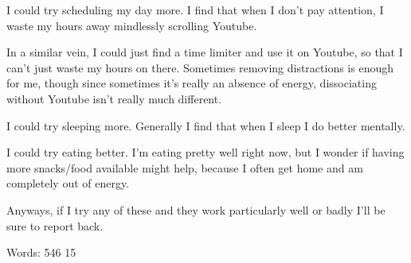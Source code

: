 \documentclass[12pt]{article}[titlepage]
\newcommand{\1}{\={a}}
\newcommand{\2}{\={e}}
\newcommand{\3}{\={\i}}
\newcommand{\4}{\=o}
\newcommand{\5}{\=u}
\newcommand{\6}{\={A}}
\renewcommand{\,}{\textsuperscript{,}}
\begin{document}
I could try scheduling my day more.
I find that when I don't pay attention, I waste my hours away mindlessly scrolling Youtube.

In a similar vein, I could just find a time limiter and use it on Youtube, so that I can't just waste my hours on there.
Sometimes removing distractions is enough for me, though since sometimes it's really an absence of energy, dissociating without Youtube isn't really much different.

I could try sleeping more.
Generally I find that when I sleep I do better mentally.

I could try eating better.
I'm eating pretty well right now, but I wonder if having more snacks/food available might help, because I often get home and am completely out of energy.

Anyways, if I try any of these and they work particularly well or badly I'll be sure to report back.

Words: 546 15
\end{document}
